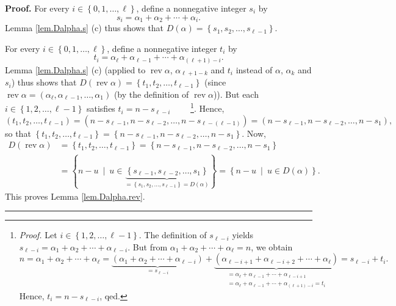 \documentclass[numbers=enddot,12pt,final,onecolumn,notitlepage,abstracton]{scrartcl}
\theoremstyle{definition}
\newenvironment{proof}[1][Proof]{\noindent\textbf{#1.} }{\ \rule{0.5em}{0.5em}}
\newenvironment{verlong}{}{}
\begin{document}
\begin{verlong}
\begin{footnotesize}
\begin{proof}
For every $i\in\left\{  0,1,\ldots,\ell\right\}  $, define a nonnegative
integer $s_{i}$ by
\[
s_{i}=\alpha_{1}+\alpha_{2}+\cdots+\alpha_{i}.
\]
Lemma \ref{lem.Dalpha.s} (c) thus shows that $D\left(  \alpha\right)
=\left\{  s_{1},s_{2},\ldots,s_{\ell-1}\right\}  $.

For every $i\in\left\{  0,1,\ldots,\ell\right\}  $, define a nonnegative
integer $t_{i}$ by
\[
t_{i}=\alpha_{\ell}+\alpha_{\ell-1}+\cdots+\alpha_{\left(  \ell+1\right)
-i}.
\]
Lemma \ref{lem.Dalpha.s} (c) (applied to $\operatorname*{rev}\alpha$,
$\alpha_{\ell+1-k}$ and $t_{i}$ instead of $\alpha$, $\alpha_{k}$ and $s_{i}$)
thus shows that $D\left(  \operatorname*{rev}\alpha\right)  =\left\{
t_{1},t_{2},\ldots,t_{\ell-1}\right\}  $ (since $\operatorname*{rev}%
\alpha=\left(  \alpha_{\ell},\alpha_{\ell-1},\ldots,\alpha_{1}\right)  $ (by
the definition of $\operatorname*{rev}\alpha$)). But each $i\in\left\{
1,2,\ldots,\ell-1\right\}  $ satisfies $t_{i}=n-s_{\ell-i}$%
\ \ \ \ \footnote{\textit{Proof.} Let $i\in\left\{  1,2,\ldots,\ell-1\right\}
$. The definition of $s_{\ell-i}$ yields $s_{\ell-i}=\alpha_{1}+\alpha
_{2}+\cdots+\alpha_{\ell-i}$. But from $\alpha_{1}+\alpha_{2}+\cdots
+\alpha_{\ell}=n$, we obtain%
\[
n=\alpha_{1}+\alpha_{2}+\cdots+\alpha_{\ell}=\underbrace{\left(  \alpha
_{1}+\alpha_{2}+\cdots+\alpha_{\ell-i}\right)  }_{=s_{\ell-i}}%
+\underbrace{\left(  \alpha_{\ell-i+1}+\alpha_{\ell-i+2}+\cdots+\alpha_{\ell
}\right)  }_{\substack{=\alpha_{\ell}+\alpha_{\ell-1}+\cdots+\alpha_{\ell
-i+1}\\=\alpha_{\ell}+\alpha_{\ell-1}+\cdots+\alpha_{\left(  \ell+1\right)
-i}=t_{i}}}=s_{\ell-i}+t_{i}.
\]
Hence, $t_{i}=n-s_{\ell-i}$, qed.}. Hence,
\[
\left(  t_{1},t_{2},\ldots,t_{\ell-1}\right)  =\left(  n-s_{\ell-1}%
,n-s_{\ell-2},\ldots,n-s_{\ell-\left(  \ell-1\right)  }\right)  =\left(
n-s_{\ell-1},n-s_{\ell-2},\ldots,n-s_{1}\right)  ,
\]
so that $\left\{  t_{1},t_{2},\ldots,t_{\ell-1}\right\}  =\left\{
n-s_{\ell-1},n-s_{\ell-2},\ldots,n-s_{1}\right\}  $. Now,%
\begin{align*}
D\left(  \operatorname*{rev}\alpha\right)   &  =\left\{  t_{1},t_{2}%
,\ldots,t_{\ell-1}\right\}  =\left\{  n-s_{\ell-1},n-s_{\ell-2},\ldots
,n-s_{1}\right\} \\
&  =\left\{  n-u\ \mid\ u\in\underbrace{\left\{  s_{\ell-1},s_{\ell-2}%
,\ldots,s_{1}\right\}  }_{=\left\{  s_{1},s_{2},\ldots,s_{\ell-1}\right\}
=D\left(  \alpha\right)  }\right\}  =\left\{  n-u\ \mid\ u\in D\left(
\alpha\right)  \right\}  .
\end{align*}
This proves Lemma \ref{lem.Dalpha.rev}.
\end{proof}


\end{footnotesize}
\end{verlong}
\end{document}
